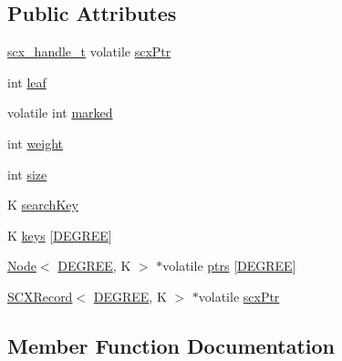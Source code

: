 \subsection*{Public Attributes}
\begin{DoxyCompactItemize}
\item 
\hyperlink{scx__provider_8h_a368fa55a4b553010913289d3cbe6ce22}{scx\+\_\+handle\+\_\+t} volatile \hyperlink{structabtree__ns_1_1Node_ac66e083264c1a5229b42bf14ffcdf291}{scx\+Ptr}
\item 
int \hyperlink{structabtree__ns_1_1Node_ad538165f856eaf1502414a77ae0b6201}{leaf}
\item 
volatile int \hyperlink{structabtree__ns_1_1Node_a0452d341b415a50854e612d2d8bc2fde}{marked}
\item 
int \hyperlink{structabtree__ns_1_1Node_a85910bf98f322370af50db4fa6e8bf75}{weight}
\item 
int \hyperlink{structabtree__ns_1_1Node_a681685fe9668f05a34770c59772d71c2}{size}
\item 
K \hyperlink{structabtree__ns_1_1Node_a8723eee7563acc9b8b9cef9b43ca50ea}{search\+Key}
\item 
K \hyperlink{structabtree__ns_1_1Node_a8d975a4678747a2d60e5bf9ca298a29a}{keys} \mbox{[}\hyperlink{brown__sigouin__abtree__kcas_2adapter_8h_a5d88b17d70c985f2f2b8e987037fd6dd}{D\+E\+G\+R\+EE}\mbox{]}
\item 
\hyperlink{structabtree__ns_1_1Node}{Node}$<$ \hyperlink{brown__sigouin__abtree__kcas_2adapter_8h_a5d88b17d70c985f2f2b8e987037fd6dd}{D\+E\+G\+R\+EE}, K $>$ $\ast$volatile \hyperlink{structabtree__ns_1_1Node_a01e6606a48515df91a90bb8883268d7a}{ptrs} \mbox{[}\hyperlink{brown__sigouin__abtree__kcas_2adapter_8h_a5d88b17d70c985f2f2b8e987037fd6dd}{D\+E\+G\+R\+EE}\mbox{]}
\item 
\hyperlink{structabtree__ns_1_1SCXRecord}{S\+C\+X\+Record}$<$ \hyperlink{brown__sigouin__abtree__kcas_2adapter_8h_a5d88b17d70c985f2f2b8e987037fd6dd}{D\+E\+G\+R\+EE}, K $>$ $\ast$volatile \hyperlink{structabtree__ns_1_1Node_ab87fb71024cde735cae0a2fbddf5190d}{scx\+Ptr}
\end{DoxyCompactItemize}


\subsection{Member Function Documentation}
\mbox{\label{structabtree__ns_1_1Node_a65085f4a2fe4688479a71c50238bac69}} 

